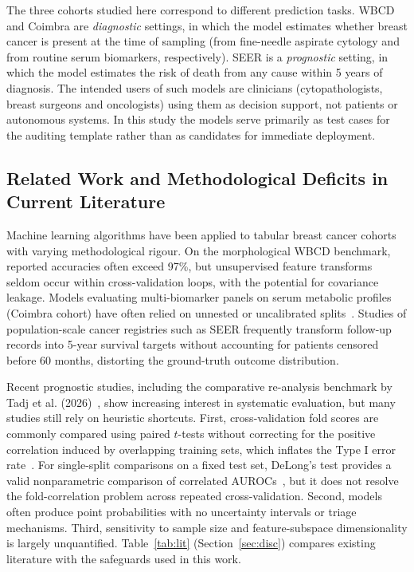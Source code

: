 \documentclass[11pt,a4paper]{article}
\begin{document}
The three cohorts studied here correspond to different prediction tasks. WBCD and Coimbra are \emph{diagnostic} settings, in which the model estimates whether breast cancer is present at the time of sampling (from fine-needle aspirate cytology and from routine serum biomarkers, respectively). SEER is a \emph{prognostic} setting, in which the model estimates the risk of death from any cause within 5 years of diagnosis. The intended users of such models are clinicians (cytopathologists, breast surgeons and oncologists) using them as decision support, not patients or autonomous systems. In this study the models serve primarily as test cases for the auditing template rather than as candidates for immediate deployment.

\subsection{Related Work and Methodological Deficits in Current Literature}\label{sec:related-work-and-methodologica}
Machine learning algorithms have been applied to tabular breast cancer cohorts with varying methodological rigour. On the morphological WBCD benchmark, reported accuracies often exceed 97\%, but unsupervised feature transforms seldom occur within cross-validation loops, with the potential for covariance leakage. Models evaluating multi-biomarker panels on serum metabolic profiles (Coimbra cohort) have often relied on unnested or uncalibrated splits~\cite{patricio2018}. Studies of population-scale cancer registries such as SEER frequently transform follow-up records into 5-year survival targets without accounting for patients censored before 60 months, distorting the ground-truth outcome distribution.

Recent prognostic studies, including the comparative re-analysis benchmark by Tadj et al. (2026)~\cite{tadj2026}, show increasing interest in systematic evaluation, but many studies still rely on heuristic shortcuts. First, cross-validation fold scores are commonly compared using paired $t$-tests without correcting for the positive correlation induced by overlapping training sets, which inflates the Type I error rate~\cite{nadeau2003}. For single-split comparisons on a fixed test set, DeLong's test provides a valid nonparametric comparison of correlated AUROCs~\cite{delong1988}, but it does not resolve the fold-correlation problem across repeated cross-validation. Second, models often produce point probabilities with no uncertainty intervals or triage mechanisms. Third, sensitivity to sample size and feature-subspace dimensionality is largely unquantified. Table~\ref{tab:lit} (Section~\ref{sec:disc}) compares existing literature with the safeguards used in this work.
\end{document}
